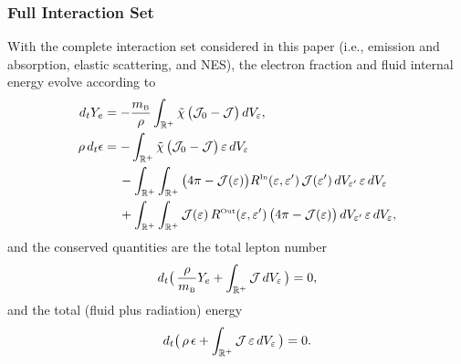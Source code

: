 \documentclass[10pt,preprint]{aastex}
\begin{document}
\subsubsection{Full Interaction Set}

With the complete interaction set considered in this paper (i.e., emission and absorption, elastic scattering, and NES), the electron fraction and fluid internal energy evolve according to
\begin{align}
  d_{t}Y_{e}
  &=-\frac{m_{\mbox{\tiny B}}}{\rho}\int_{\mathbb{R}^{+}}\tilde{\chi}\,\big(\mathcal{J}_{0}-\mathcal{J}\big)\,dV_{\varepsilon}, \\
  \rho\,d_{t}\epsilon
  &=-\int_{\mathbb{R}^{+}}\tilde{\chi}\,\big(\mathcal{J}_{0}-\mathcal{J}\big)\,\varepsilon\,dV_{\varepsilon} \nonumber \\
  &\hspace{12pt}
  -\int_{\mathbb{R}^{+}}\int_{\mathbb{R}^{+}}\big(4\pi-\mathcal{J}(\varepsilon)\big)R^{\mbox{\tiny In}}(\varepsilon,\varepsilon')\,\mathcal{J}(\varepsilon')\,dV_{\varepsilon'}\,\varepsilon\,dV_{\varepsilon} \nonumber \\
  &\hspace{12pt}
  +\int_{\mathbb{R}^{+}}\int_{\mathbb{R}^{+}}\mathcal{J}(\varepsilon)\,R^{\mbox{\tiny Out}}(\varepsilon,\varepsilon')\,\big(4\pi-\mathcal{J}(\varepsilon)\big)\,dV_{\varepsilon'}\,\varepsilon\,dV_{\varepsilon},
\end{align}
and the conserved quantities are the total lepton number
\begin{equation}
  d_{t}\big(\,\frac{\rho}{m_{\mbox{\tiny B}}}Y_{e}+\int_{\mathbb{R}^{+}}\mathcal{J}\,dV_{\varepsilon}\,\big)=0,
  \label{eq:leptonConservationFull}
\end{equation}
and the total (fluid plus radiation) energy
\begin{equation}
  d_{t}\big(\,\rho\,\epsilon+\int_{\mathbb{R}^{+}}\mathcal{J}\,\varepsilon\,dV_{\varepsilon}\,\big)=0.  
  \label{eq:energyConservationFull}
\end{equation}
\end{document}
